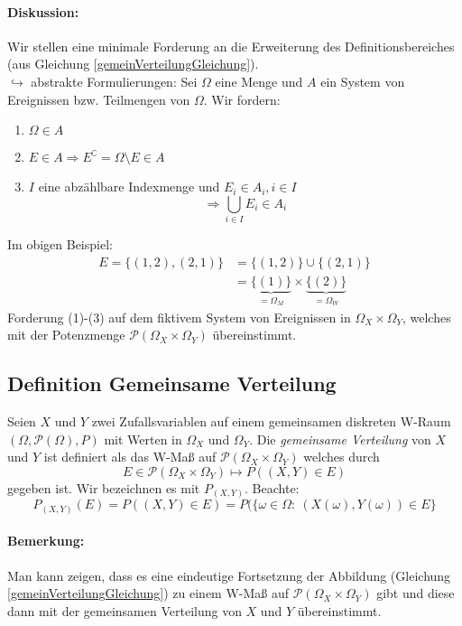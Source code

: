 \documentclass[12pt,a4paper]{article}
\begin{document}
	\paragraph{Diskussion:} Wir stellen eine minimale Forderung an die Erweiterung des Definitionsbereiches (aus Gleichung \ref{gemeinVerteilungGleichung}). \\
	$\hookrightarrow$ abstrakte Formulierungen:
	Sei $\Omega$ eine Menge und $A$ ein System von Ereignissen bzw. Teilmengen von $\Omega$. Wir fordern:
	\begin{enumerate}
		\item	$\Omega\in A$ 
		\item	$E\in A \Rightarrow E^\complement = \Omega\setminus E\in A$
		\item	$I$ eine abzählbare Indexmenge und $E_i \in A_i, i\in I$
				$$\Rightarrow\bigcup_{i\in I}E_i \in A_i$$
	\end{enumerate}
	Im obigen Beispiel: 
	\begin{align*}
	E=\{(1,2),(2,1)\} & =\{(1,2)\}\cup\{(2,1)\}\\
	& =\underbrace{\{(1)\}}_{=\Omega_M} \times \underbrace{\{(2)\}}_{=\Omega_W}
	\end{align*}
	Forderung (1)-(3) auf dem fiktivem System von Ereignissen in $\Omega_X \times\Omega_Y$, welches mit der Potenzmenge $\mathcal{P}(\Omega_X \times \Omega_Y)$ übereinstimmt.
	
	\subsection{Definition Gemeinsame Verteilung}
	Seien $X$ und $Y$ zwei Zufallsvariablen auf einem gemeinsamen diskreten W-Raum\\ $(\Omega,\mathcal{P}(\Omega),P)$ mit Werten in $\Omega_X$ und $\Omega_Y$. Die \textit{gemeinsame Verteilung} von $X$ und $Y$ ist definiert als das W-Maß auf $\mathcal{P}(\Omega_X \times \Omega_Y)$ welches durch
	$$E\in\mathcal{P}(\Omega_X \times \Omega_Y)\longmapsto P((X,Y)\in E)$$
	gegeben ist. Wir bezeichnen es mit $P_{(X,Y)}$.
	Beachte: 
	$$P_{(X,Y)}(E)=P((X,Y)\in E)= P(\{\omega\in\Omega: \: (X(\omega),Y(\omega))\in E\}$$
	\paragraph{Bemerkung:}
	Man kann zeigen, dass es eine eindeutige Fortsetzung der Abbildung (Gleichung \ref{gemeinVerteilungGleichung}) zu einem W-Maß auf $\mathcal{P}(\Omega_X \times \Omega_Y)$ gibt und diese dann mit der gemeinsamen Verteilung von $X$ und $Y$ übereinstimmt.
	
\end{document}
